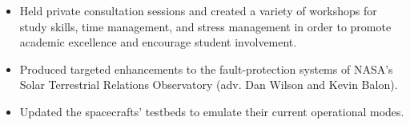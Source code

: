 \documentclass[10pt,a4paper,ragged2e,withhyper]{altacv}
\begin{document}
\begin{paracol}{2}
\divider

\begin{itemize}
  \item Held private consultation sessions and created a variety of workshops for study skills, time management, and stress management in order to promote academic excellence and encourage student involvement.
\end{itemize}

\divider

\begin{itemize}
  \item Produced targeted enhancements to the fault-protection systems of NASA's Solar Terrestrial Relations Observatory (adv. Dan Wilson and Kevin Balon).
  \item Updated the spacecrafts' testbeds to emulate their current operational modes.
\end{itemize}








\nocite{*}

\printbibliography[heading=pubtype,title={\printinfo{\faBook}{Books}},type=book]


\end{paracol}
\end{document}
